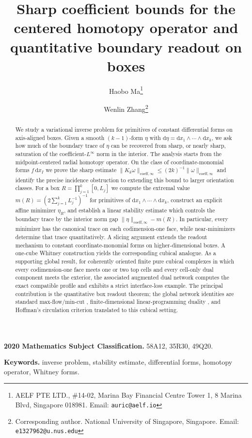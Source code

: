 \documentclass[11pt,letterpaper]{article}
\title{Sharp coefficient bounds for the centered homotopy operator and quantitative boundary readout on boxes}
\author{
  Haobo Ma\thanks{AELF PTE LTD., \#14-02, Marina Bay Financial Centre Tower 1, 8 Marina Blvd, Singapore 018981. Email: \texttt{auric@aelf.io}}
  \and
  Wenlin Zhang\thanks{Corresponding author. National University of Singapore, Singapore. Email: \texttt{e1327962@u.nus.edu}}
}
\date{}
\numberwithin{equation}{section}
\theoremstyle{plain}
\theoremstyle{definition}
\theoremstyle{remark}
\newcommand{\dd}{\mathrm{d}}
\newcommand{\norm}[1]{\lVert #1 \rVert}
\newcommand{\coeff}{\mathrm{coeff}}
\begin{document}
\maketitle

\begin{abstract}
We study a variational inverse problem for primitives of constant
differential forms on axis-aligned boxes. Given a smooth $(k-1)$-form $\eta$
with $\dd\eta=\dd x_1\wedge\cdots\wedge\dd x_k$, we ask how much of the
boundary trace of $\eta$ can be recovered from sharp, or nearly sharp,
saturation of the coefficient-$L^\infty$ norm in the interior. The analysis
starts from the midpoint-centered radial homotopy operator. On the class of
coordinate-monomial forms $f\,\dd x_I$ we prove the sharp estimate
$\norm{K_k\omega}_{\coeff,\infty}\le (2k)^{-1}\norm{\omega}_{\coeff,\infty}$
and identify the precise incidence obstruction to extending this bound to
larger orientation classes. For a box $R=\prod_{j=1}^k[0,L_j]$ we compute the
extremal value $m(R)=(2\sum_{j=1}^kL_j^{-1})^{-1}$ for primitives of
$\dd x_1\wedge\cdots\wedge\dd x_k$, construct an explicit affine minimizer
$\eta_R$, and establish a linear stability estimate which controls the
boundary trace by the interior norm gap
$\norm{\eta}_{\coeff,\infty}-m(R)$. In particular, every minimizer has the
canonical trace on each codimension-one face, while near-minimizers determine
that trace quantitatively. A slicing argument extends the readout mechanism to
constant coordinate-monomial forms on higher-dimensional boxes. A one-cube
Whitney construction yields the corresponding cubical analogue. As a
supporting global result, for coherently oriented finite pure cubical
complexes in which every codimension-one face meets one or two top cells and
every cell-only dual component meets the exterior, the associated augmented
dual network computes the exact compatible profile and exhibits a strict
interface-loss example. The principal contribution is the quantitative box
readout theorem; the global network identities are standard max-flow/min-cut
\cite{Nozawa1990,Grieser2006,Strang2010}, finite-dimensional
linear-programming duality \cite{BachemKern1992}, and Hoffman's circulation
criterion \cite{Hoffman1960} translated to this cubical setting.
\end{abstract}

\bigskip
\noindent\textbf{2020 Mathematics Subject Classification.} 58A12, 35R30, 49Q20.

\noindent\textbf{Keywords.} inverse problem, stability estimate,
differential forms, homotopy operator, Whitney forms.
\end{document}
